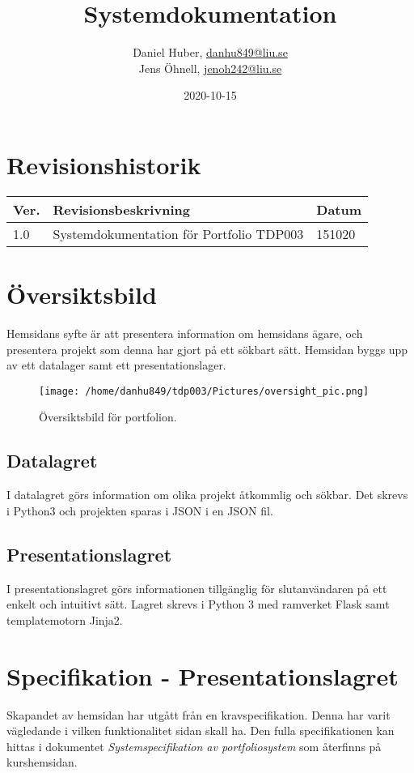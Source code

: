\documentclass{TDP003mall}
\author{Daniel Huber, \url{danhu849@liu.se}\\
  Jens Öhnell, \url{jenoh242@liu.se}}
\title{Systemdokumentation}
\date{2020-10-15}
\begin{document}
\projectpage
\section{Revisionshistorik}
\begin{table}[!h]
\begin{tabularx}{\linewidth}{|l|X|l|}
\hline
Ver. & Revisionsbeskrivning & Datum \\\hline
1.0 & Systemdokumentation för Portfolio TDP003 & 151020 \\\hline
\end{tabularx}
\end{table}


\section{Översiktsbild}
Hemsidans syfte är att presentera information om hemsidans ägare, och presentera projekt som denna har gjort på ett sökbart sätt. Hemsidan byggs upp av ett datalager samt ett presentationslager.
\begin{figure}[h]
  \centerline{\texttt{[image: /home/danhu849/tdp003/Pictures/oversight\_pic.png]}}
  \caption{Översiktsbild för portfolion. \label{fig:1}}
\end{figure}


\subsection{Datalagret}
I datalagret görs information om olika projekt åtkommlig och sökbar. Det skrevs i Python3 och projekten sparas i JSON i en JSON fil.

\subsection{Presentationslagret}
I presentationslagret görs informationen tillgänglig för slutanvändaren på ett enkelt och intuitivt sätt. Lagret skrevs i Python 3 med ramverket Flask samt templatemotorn Jinja2.

\section{Specifikation - Presentationslagret}
Skapandet av hemsidan har utgått från en kravspecifikation. Denna har varit vägledande i vilken funktionalitet sidan skall ha. Den fulla specifikationen kan hittas i dokumentet \textit{Systemspecifikation av portfoliosystem} som återfinns på kurshemsidan.
\end{document}
